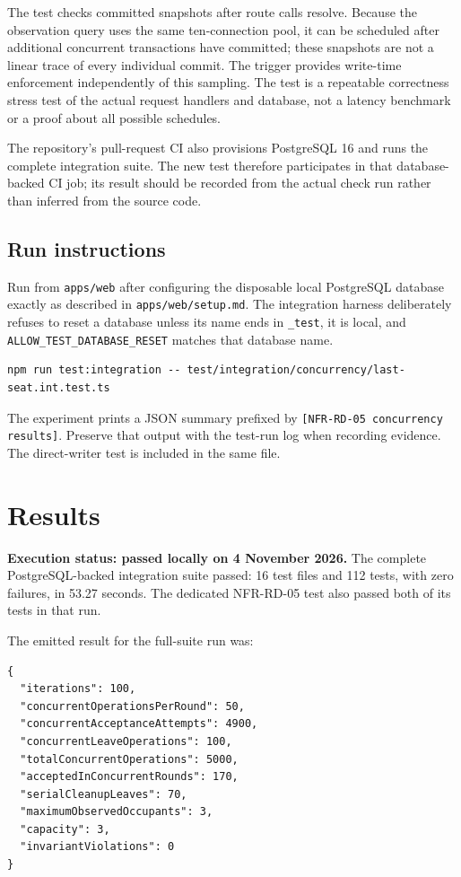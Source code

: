 \documentclass[11pt,a4paper]{article}
\begin{document}
The test checks committed snapshots after route calls resolve. Because the observation query
uses the same ten-connection pool, it can be scheduled after additional concurrent transactions
have committed; these snapshots are not a linear trace of every individual commit. The trigger
provides write-time enforcement independently of this sampling. The test is a repeatable
correctness stress test of the actual request handlers and database, not a latency benchmark or
a proof about all possible schedules.

The repository's pull-request CI also provisions PostgreSQL 16 and runs the complete integration
suite. The new test therefore participates in that database-backed CI job; its result should be
recorded from the actual check run rather than inferred from the source code.

\subsection{Run instructions}

Run from \texttt{apps/web} after configuring the disposable local PostgreSQL database exactly as
described in \texttt{apps/web/setup.md}. The integration harness deliberately refuses to reset a
database unless its name ends in \texttt{\_test}, it is local, and
\texttt{ALLOW\_TEST\_DATABASE\_RESET} matches that database name.

\begin{lstlisting}
npm run test:integration -- test/integration/concurrency/last-seat.int.test.ts
\end{lstlisting}

The experiment prints a JSON summary prefixed by
\texttt{[NFR-RD-05 concurrency results]}. Preserve that output with the test-run log when
recording evidence. The direct-writer test is included in the same file.

\section{Results}

\textbf{Execution status: passed locally on 4 November 2026.} The complete
PostgreSQL-backed integration suite passed: 16 test files and 112 tests, with zero failures, in
53.27 seconds. The dedicated NFR-RD-05 test also passed both of its tests in that run.

The emitted result for the full-suite run was:
\begin{lstlisting}
{
  "iterations": 100,
  "concurrentOperationsPerRound": 50,
  "concurrentAcceptanceAttempts": 4900,
  "concurrentLeaveOperations": 100,
  "totalConcurrentOperations": 5000,
  "acceptedInConcurrentRounds": 170,
  "serialCleanupLeaves": 70,
  "maximumObservedOccupants": 3,
  "capacity": 3,
  "invariantViolations": 0
}
\end{lstlisting}
\end{document}
